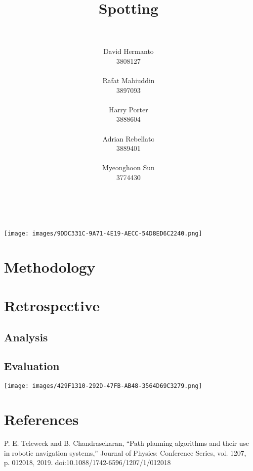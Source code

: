 \documentclass[10pt,english]{article}
\title{\huge{\textbf{Spotting}}}
\author{
    \\\\
    David Hermanto\\
    \small 3808127\\
    \\
    Rafat Mahiuddin\\
    \small 3897093\\
    \\
    Harry Porter\\
    \small 3888604\\
    \\
    Adrian Rebellato\\
    \small 3889401\\
    \\
    Myeonghoon Sun\\
    \small 3774430\\
    \\\\
}
\date{}
\begin{document}
\maketitle
\thispagestyle{empty}
\clearpage

\vspace*{\fill}
\begin{center}
\texttt{[image: images/9DDC331C-9A71-4E19-AECC-54D8ED6C2240.png]}
\end{center}
\vfill
\thispagestyle{empty}

\clearpage


\section{Methodology}
\clearpage

\section{Retrospective}
\clearpage

\subsection{Analysis}
\clearpage

\subsection{Evaluation}
\clearpage

\vspace*{\fill}
\begin{center}
\texttt{[image: images/429F1310-292D-47FB-AB48-3564D69C3279.png]}
\end{center}
\vfill
\thispagestyle{empty}
\clearpage

\section*{References}

\begin{enumerate}[leftmargin=*,label={\texttt{[\arabic*]}},noitemsep]
    \item P. E. Teleweck and B. Chandrasekaran, “Path planning algorithms and their use in robotic navigation systems,” Journal of Physics: Conference Series, vol. 1207, p. 012018, 2019. doi:10.1088/1742-6596/1207/1/012018
\end{enumerate}
\end{document}
